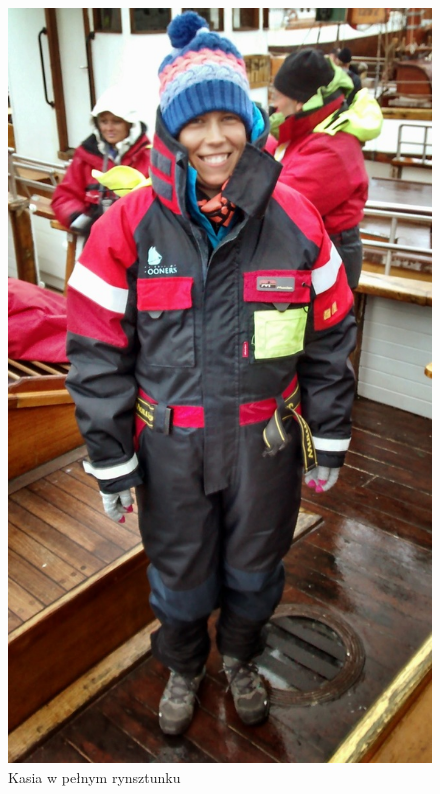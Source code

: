 \begin{figure}[h]
	\centering
	\includegraphics[height=.8\linewidth]{./photos/x-s-2014-08-07_19-54-58__84.jpg}
	\caption*{Kasia w pełnym rynsztunku}
	\label{img:whalewatching_clothing}
\end{figure}

\pagebreak
